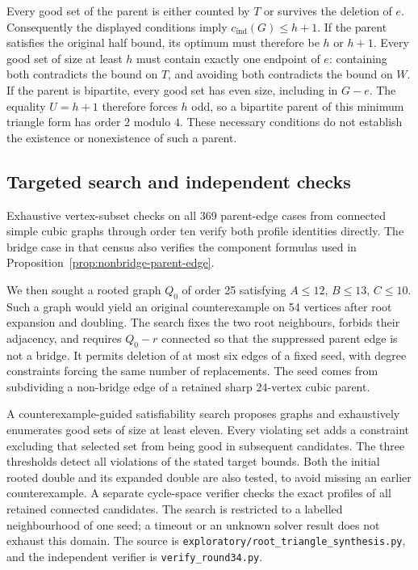 \documentclass[11pt]{article}
\newcommand{\cind}{c_{\mathrm{ind}}}
\begin{document}
Every good set of the parent is either counted by $T$ or survives
the deletion of $e$. Consequently the displayed conditions imply
$\cind(G)\leq h+1$. If the parent satisfies the original half bound,
its optimum must therefore be $h$ or $h+1$. Every good set of size
at least $h$ must contain exactly one endpoint of $e$: containing
both contradicts the bound on $T$, and avoiding both contradicts
the bound on $W$.
If the parent is bipartite, every good set has even size, including
in $G-e$. The equality $U=h+1$ therefore forces $h$ odd, so a
bipartite parent of this minimum triangle form has order $2$ modulo $4$.
These necessary conditions do not establish the existence or
nonexistence of such a parent.

\subsection{Targeted search and independent checks}
Exhaustive vertex-subset checks on all 369 parent-edge cases from
connected simple cubic graphs through order ten verify both profile
identities directly. The bridge case in that census also verifies
the component formulas used in Proposition~\ref{prop:nonbridge-parent-edge}.

We then sought a rooted graph $Q_0$ of order 25 satisfying
$A\leq12$, $B\leq13$, $C\leq10$. Such a graph would yield an
original counterexample on 54 vertices after root expansion and
doubling. The search fixes the two root neighbours, forbids their
adjacency, and requires $Q_0-r$ connected so that the suppressed
parent edge is not a bridge. It permits deletion of at most six
edges of a fixed seed, with degree constraints forcing the same
number of replacements. The seed comes from subdividing a non-bridge
edge of a retained sharp 24-vertex cubic parent.

A counterexample-guided satisfiability search proposes graphs and
exhaustively enumerates good sets of size at least eleven. Every
violating set adds a constraint excluding that selected set from
being good in subsequent candidates. The three thresholds detect
all violations of the stated target bounds. Both the initial
rooted double and its expanded double are also tested, to avoid
missing an earlier counterexample. A separate cycle-space verifier
checks the exact profiles of all retained connected candidates.
The search is restricted to a labelled neighbourhood of one seed;
a timeout or an unknown solver result does not exhaust this domain.
The source is \texttt{exploratory/root\_triangle\_synthesis.py},
and the independent verifier is \texttt{verify\_round34.py}.
\end{document}
